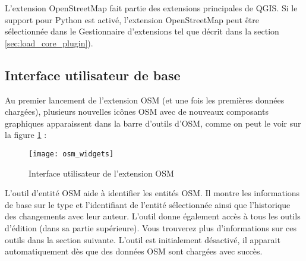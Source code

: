 L'extension OpenStreetMap fait partie des extensions principales de QGIS. Si le support pour Python est activé, l'extension OpenStreetMap peut être sélectionnée dans le Gestionnaire d'extensions tel que décrit dans la section \ref{sec:load_core_plugin}).

\subsection{Interface utilisateur de base}

Au premier lancement de l'extension OSM (et une fois les premières données chargées), plusieurs nouvelles icônes OSM avec de nouveaux composants graphiques apparaissent dans la barre d'outils d'OSM, comme on peut le voir sur la figure \ref{fig:osmwidget} :

\begin{figure}[ht]
   \centering
   \texttt{[image: osm\_widgets]}
   \caption{Interface utilisateur de l'extension OSM \nixcaption}\label{fig:osmwidget}
\end{figure}


L'outil d'entité OSM aide à identifier les entités OSM. Il montre les informations de base sur le type et l'identifiant de l'entité sélectionnée ainsi que l'historique des changements avec leur auteur. L'outil donne également accès à tous les outils d'édition (dans sa partie supérieure). Vous trouverez plus d'informations sur ces outils dans la section suivante. L'outil est initialement désactivé, il apparait automatiquement dès que des données OSM sont chargées avec succès.

